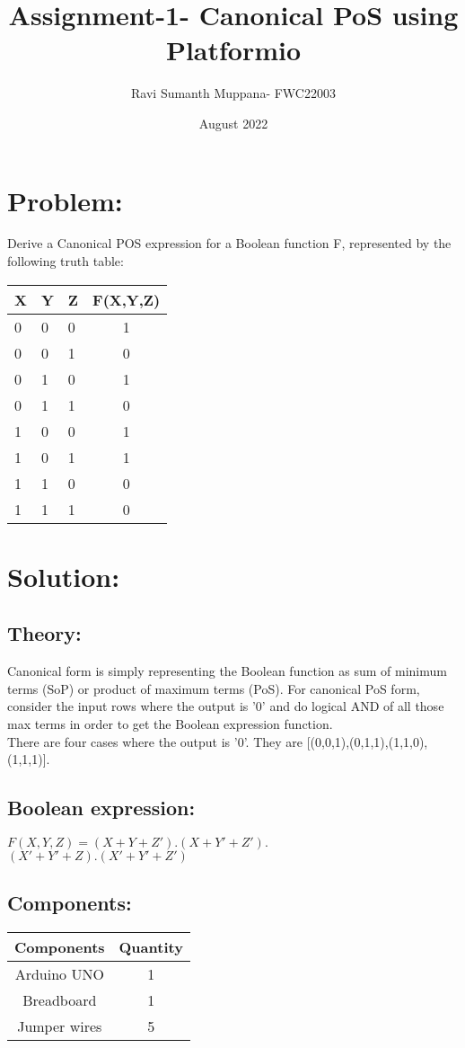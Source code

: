 \documentclass[a4paper,12pt,twocolumn]{article}
\title{Assignment-1- Canonical PoS using Platformio}
\author{Ravi Sumanth Muppana- FWC22003}
\date{August 2022}
\begin{document}
\maketitle

\section{Problem:}
Derive a Canonical POS expression for a Boolean function F, represented by the following truth table:

\begin{tabular}{|l|l|l|c|}
	\hline
	X&Y&Z&F(X,Y,Z)\\
	\hline
	0&0&0&1\\
	0&0&1&0\\
	0&1&0&1\\
	0&1&1&0\\
	1&0&0&1\\
	1&0&1&1\\
	1&1&0&0\\
	1&1&1&0\\
	\hline
\end{tabular}

	
\maketitle\section{Solution:}
\subsection{Theory:}
Canonical form is simply representing the Boolean function as sum of minimum terms (SoP) or product of maximum terms (PoS). For canonical PoS form, consider the input rows where the output is '0' and do logical AND of all those max terms in order to get the Boolean expression function.\\
There are four cases where the output is '0'. They are [(0,0,1),(0,1,1),(1,1,0),(1,1,1)]. 
\subsection{Boolean expression:}
$F(X,Y,Z)=(X+Y+Z').(X+Y'+Z').$\\$(X'+Y'+Z).(X'+Y'+Z')$

\newpage
\subsection{Components:} 
\begin{tabular}{|c|c|}
	\hline
	Components&Quantity\\
	\hline
	Arduino UNO&1\\
	Breadboard&1\\
	Jumper wires&5\\
	\hline
\end{tabular}
\end{document}
